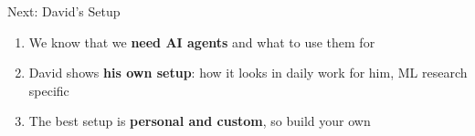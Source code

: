 \documentclass[aspectratio=169]{beamer}
\begin{document}
\begin{frame}[shrink=0]{Next: David's Setup}
  \Large
  \begin{enumerate}
    \setlength{\itemsep}{0.9em}
    \item We know that we \textbf{need AI agents} and what to use them for
    \item David shows \textbf{his own setup}: how it looks in daily work for him, ML research specific
    \item The best setup is \textbf{personal and custom}, so build your own
  \end{enumerate}
\end{frame}
\end{document}
